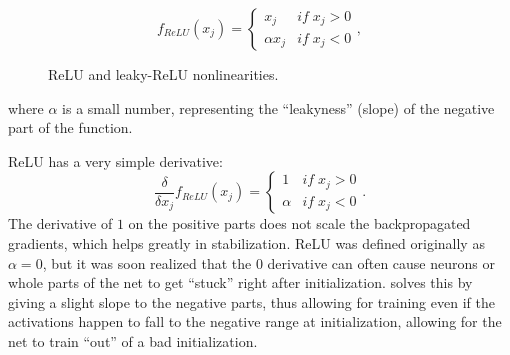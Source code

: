 			\begin{figure}[ht]
				\centering
				\begin{minipage}[t]{0.5\linewidth}
					\begin{equation}
					\label{eq:relu}
					f_{ReLU}(x_j) = \begin{cases}
					x_j & if\; x_j > 0 \\
					\alpha{x_j} & if\; x_j < 0
					\end{cases},
					\end{equation}
				\end{minipage}
				\begin{minipage}[t]{0.3\linewidth}
				\end{minipage}
				\caption[ReLU and leaky-ReLU nonlinearities]{ReLU and leaky-ReLU nonlinearities.}
				\label{fig:nonlins_relus}
			\end{figure}
			\noindent where $\alpha$ is a small number, representing the ``leakyness'' (slope) of the negative part of the function. 
			
			\ac{ReLU} has a very simple derivative:
			\begin{equation}
				\frac{\delta}{\delta{x_j}} f_{ReLU}(x_j) = \begin{cases}
					1 & if\; x_j > 0 \\
					\alpha & if\; x_j < 0
				\end{cases}.
			\end{equation}
			\noindent The derivative of $1$ on the positive parts does not scale the backpropagated gradients, which helps greatly in stabilization.
			\ac{ReLU} was defined originally as $\alpha = 0$, but it was soon realized that the $0$ derivative can often cause neurons or whole parts of the net to get ``stuck'' right after initialization.
			 solves this by giving a slight slope to the negative parts, thus allowing for training even if the activations happen to fall to the negative range at initialization, allowing for the net to train ``out'' of a bad initialization.		
			
